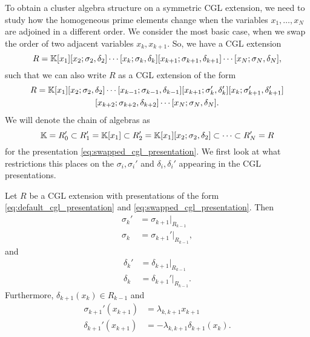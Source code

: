 To obtain a cluster algebra structure on a symmetric CGL extension, we need to study
how the homogeneous prime elements change when the variables $x_1, \dots, x_N$ are
adjoined in a different order. We consider the most basic case, when we swap the order
of two adjacent variables $x_k, x_{k+1}$. So, we have a CGL extension
\begin{equation}\label{eq:default_cgl_presentation}
	R = \mathbb{K}[x_1][x_2; \sigma_2, \delta_2]\cdots[x_k; \sigma_k, \delta_k][x_{k+1};\sigma_{k+1}, \delta_{k+1}]\cdots[x_N; \sigma_N, \delta_N],
\end{equation}
%
such that we can also write $R$ as a CGL extension of the form
\begin{multline}\label{eq:swapped_cgl_presentation}
	R = \mathbb{K}[x_1][x_2; \sigma_2, \delta_2]\cdots[x_{k-1}; \sigma_{k-1}, \delta_{k-1}][x_{k+1}; \sigma_k', \delta_k'][x_k;\sigma_{k+1}', \delta_{k+1}']\\
	[x_{k+2}; \sigma_{k+2}, \delta_{k+2}]\cdots[x_N; \sigma_N, \delta_N].
\end{multline}
%
We will denote the chain of algebras as
\begin{equation*}
	\mathbb{K} = R'_0 \subset R'_1  = \mathbb{K}[x_1] \subset R'_2 = \mathbb{K}[x_1][x_2; \sigma_2, \delta_2] \subset \cdots \subset R'_N = R
\end{equation*}
for the presentation \eqref{eq:swapped_cgl_presentation}.
We first look at what restrictions this places on the $\sigma_i, \sigma_i '$ and
$\delta_i,\delta_i'$ appearing in the CGL presentations.
\begin{lemma}\label{lem:swapped_cgl_sigma_delta}
	Let $R$ be a CGL extension with presentations of the form \eqref{eq:default_cgl_presentation} and \eqref{eq:swapped_cgl_presentation}. Then
	\begin{equation}\label{eq:sigma_prime}
		\begin{aligned}
			\sigma_k ' & = \sigma_{k+1}|_{R_{k-1}}    \\
			\sigma_k   & = \sigma_{k+1}' |_{R_{k-1}},
		\end{aligned}
	\end{equation}
	and
	\begin{equation}\label{eq:delta_prime}
		\begin{aligned}
			\delta_k ' & = \delta_{k+1}|_{R_{k-1}}    \\
			\delta_k   & = \delta_{k+1}' |_{R_{k-1}}.
		\end{aligned}
	\end{equation}
	Furthermore, $\delta_{k+1}(x_k) \in R_{k-1}$ and
	\begin{equation}\label{eq:sigma_delta_prime_x_k_1}
		\begin{aligned}
			\sigma_{k+1}'(x_{k+1}) & = \lambda_{k, k+1} x_{k+1}             \\
			\delta_{k+1}'(x_{k+1}) & = -\lambda_{k, k+1} \delta_{k+1}(x_k).
		\end{aligned}
	\end{equation}
\end{lemma}

